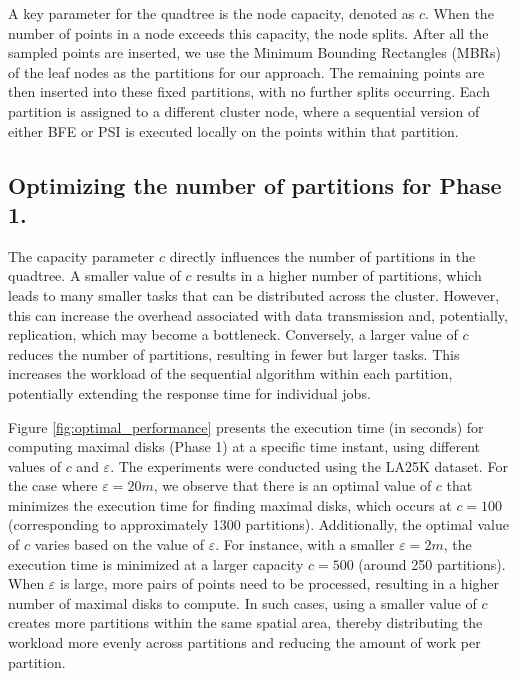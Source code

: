 A key parameter for the quadtree is the node capacity, denoted as $c$. When the number of points in a node exceeds this capacity, the node splits. After all the sampled points are inserted, we use the Minimum Bounding Rectangles (MBRs) of the leaf nodes as the partitions for our approach. The remaining points are then inserted into these fixed partitions, with no further splits occurring. Each partition is assigned to a different cluster node, where a sequential version of either BFE or PSI is executed locally on the points within that partition.

\subsection{Optimizing the number of partitions for Phase 1.}
The capacity parameter $c$ directly influences the number of partitions in the quadtree. A smaller value of $c$ results in a higher number of partitions, which leads to many smaller tasks that can be distributed across the cluster. However, this can increase the overhead associated with data transmission and, potentially, replication, which may become a bottleneck. Conversely, a larger value of $c$ reduces the number of partitions, resulting in fewer but larger tasks. This increases the workload of the sequential algorithm within each partition, potentially extending the response time for individual jobs.

Figure \ref{fig:optimal_performance} presents the execution time (in seconds) for computing maximal disks (Phase 1) at a specific time instant, using different values of $c$ and $\varepsilon$. The experiments were conducted using the LA25K dataset.
For the case where $\varepsilon = 20m$, we observe that there is an optimal value of $c$ that minimizes the execution time for finding maximal disks, which occurs at $c=100$ (corresponding to approximately 1300 partitions). Additionally, the optimal value of $c$ varies based on the value of $\varepsilon$. For instance, with a smaller $\varepsilon = 2m$, the execution time is minimized at a larger capacity $c=500$ (around 250 partitions).
When $\varepsilon$ is large, more pairs of points need to be processed, resulting in a higher number of maximal disks to compute. In such cases, using a smaller value of $c$ creates more partitions within the same spatial area, thereby distributing the workload more evenly across partitions and reducing the amount of work per partition.

